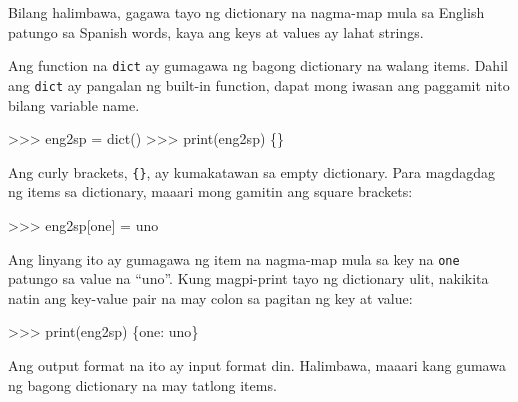 \documentclass[10pt,]{book}
\newenvironment{Shaded}{}{}
\newcommand{\BuiltInTok}[1]{\textcolor[rgb]{0.00,0.50,0.00}{#1}}
\newcommand{\NormalTok}[1]{#1}
\newcommand{\OperatorTok}[1]{\textcolor[rgb]{0.40,0.40,0.40}{#1}}
\newcommand{\StringTok}[1]{\textcolor[rgb]{0.25,0.44,0.63}{#1}}
\begin{document}
Bilang halimbawa, gagawa tayo ng dictionary na nagma-map mula sa English
patungo sa Spanish words, kaya ang keys at values ay lahat strings.

Ang function na \texttt{dict} ay gumagawa ng bagong dictionary na walang
items. Dahil ang \texttt{dict} ay pangalan ng built-in function, dapat
mong iwasan ang paggamit nito bilang variable name.

 

\begin{Shaded}
\begin{Highlighting}[]
\OperatorTok{\textgreater{}\textgreater{}\textgreater{}}\NormalTok{ eng2sp }\OperatorTok{=} \BuiltInTok{dict}\NormalTok{()}
\OperatorTok{\textgreater{}\textgreater{}\textgreater{}} \BuiltInTok{print}\NormalTok{(eng2sp)}
\NormalTok{\{\}}
\end{Highlighting}
\end{Shaded}

Ang curly brackets, \texttt{\{\}}, ay kumakatawan sa empty dictionary.
Para magdagdag ng items sa dictionary, maaari mong gamitin ang square
brackets:

 

\begin{Shaded}
\begin{Highlighting}[]
\OperatorTok{\textgreater{}\textgreater{}\textgreater{}}\NormalTok{ eng2sp[}\StringTok{\textquotesingle{}one\textquotesingle{}}\NormalTok{] }\OperatorTok{=} \StringTok{\textquotesingle{}uno\textquotesingle{}}
\end{Highlighting}
\end{Shaded}

Ang linyang ito ay gumagawa ng item na nagma-map mula sa key na
\texttt{\textquotesingle{}one\textquotesingle{}} patungo sa value na
``uno''. Kung magpi-print tayo ng dictionary ulit, nakikita natin ang
key-value pair na may colon sa pagitan ng key at value:

\begin{Shaded}
\begin{Highlighting}[]
\OperatorTok{\textgreater{}\textgreater{}\textgreater{}} \BuiltInTok{print}\NormalTok{(eng2sp)}
\NormalTok{\{}\StringTok{\textquotesingle{}one\textquotesingle{}}\NormalTok{: }\StringTok{\textquotesingle{}uno\textquotesingle{}}\NormalTok{\}}
\end{Highlighting}
\end{Shaded}

Ang output format na ito ay input format din. Halimbawa, maaari kang
gumawa ng bagong dictionary na may tatlong items.
\end{document}
